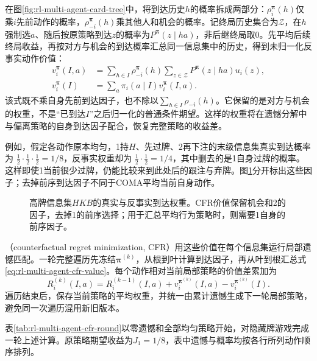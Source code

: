 在图\ref{fig:rl-multi-agent-card-tree}中，将到达历史$h$的概率拆成两部分：$\rho_i^{\bm\pi}(h)$仅乘$i$先前动作的概率，$\rho_{-i}^{\bm\pi}(h)$乘其他人和机会的概率。记终局历史集合为$\mathcal Z$，在$h$强制选$a$、随后按原策略到达$z$的概率为$P^{\bm\pi}(z\mid ha)$，非后继终局取0。先平均后续终局收益，再按对方与机会的到达概率汇总同一信息集中的历史，得到未归一化反事实动作价值：
\begin{align}
 v_i^{\bm\pi}(I,a)
 &=\sum_{h\in I}\rho_{-i}^{\bm\pi}(h)
         \sum_{z\in\mathcal Z}P^{\bm\pi}(z\mid ha)u_i(z),\\
 v_i^{\bm\pi}(I)&=\sum_a\pi_i(a\mid I)v_i^{\bm\pi}(I,a).
 \label{eq:rl-multi-agent-cfr-value}
\end{align}
该式既不乘自身先前到达因子，也不除以$\sum_{h\in I}\rho_{-i}(h)$。它保留的是对方与机会的权重，不是“已到达$I$”之后归一化的普通条件期望。这样的权重将在遗憾分解中与偏离策略的自身到达因子配合，恢复完整策略的收益差。

例如，假定各动作原本均匀，1持$H$、先过牌、2再下注的末级信息集真实到达概率为
$\tfrac12\cdot\tfrac12\cdot\tfrac12=1/8$，反事实权重却为
$\tfrac12\cdot\tfrac12=1/4$，其中删去的是1自身过牌的概率。这样即使1当前很少过牌，仍能比较来到此处后的跟注与弃牌。图\ref{fig:rl-multi-agent-cfr-reach}分开标出这些因子；去掉前序到达因子不同于COMA平均当前自身动作。

\begin{figure}[htbp]
 \centering
 
 \caption{高牌信息集$HKB$的真实与反事实到达权重。CFR价值保留机会和2的因子，去掉1的前序选择；用于汇总平均行为策略时，则需要1自身的前序因子。}
 \label{fig:rl-multi-agent-cfr-reach}
\end{figure}

（counterfactual regret minimization, CFR）用这些价值在每个信息集运行局部遗憾匹配。一轮完整遍历先冻结$\bm\pi^{(k)}$，从根到叶计算到达因子，再从叶到根汇总式\eqref{eq:rl-multi-agent-cfr-value}。每个动作相对当前局部策略的价值差累加为
\[
 R_i^{(k)}(I,a)=R_i^{(k-1)}(I,a)+
        v_i^{\bm\pi^{(k)}}(I,a)-v_i^{\bm\pi^{(k)}}(I).
\]
遍历结束后，保存当前策略的平均权重，并统一由累计遗憾生成下一轮局部策略，避免同一次遍历混用新旧版本。

表\ref{tab:rl-multi-agent-cfr-round}以零遗憾和全部均匀策略开始，对隐藏牌游戏完成一轮上述计算。原策略期望收益为$J_1=1/8$，表中遗憾与概率均按各行所列动作顺序排列。

